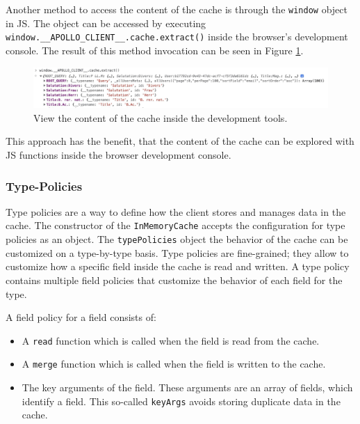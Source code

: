 \noindent Another method to access the content of the cache is through the \texttt{window} object in \ac{JS}. The object can be accessed by executing \texttt{window.\_\_APOLLO\_CLIENT\_\_.cache.extract()} inside the browser's development console. The result of this method invocation can be seen in Figure \ref{fig:background:graphql:apollo:apollo-cache-browser-window}.

\ifshowImages
  \begin{figure}[H]
    \centering
    \includegraphics[width=1\linewidth]{images/background/graphql/apollo/apollo-cache-browser-window.jpg}
    \caption{View the content of the cache inside the development tools.}\label{fig:background:graphql:apollo:apollo-cache-browser-window}
  \end{figure}
\fi

\noindent This approach has the benefit, that the content of the cache can be explored with \ac{JS} functions inside the browser development console.

\subsubsection{Type-Policies}\label{subsubsection:background:graphql:apollo-server-client:type-policies}

Type policies are a way to define how the client stores and manages data in the cache. The constructor of the \texttt{InMemoryCache} accepts the configuration for type policies as an object. The \texttt{typePolicies} object the behavior of the cache can be customized on a type-by-type basis. Type policies are fine-grained; they allow to customize how a specific field inside the cache is read and written. A type policy contains multiple field policies that customize the behavior of each field for the type. \cite{misc:-:background:graphql:apollo-client-cache-reading-writing}

\bigskip

\noindent A field policy for a field consists of: \cite{misc:-:background:graphql:apollo-client-cache-reading-writing}

\begin{itemize}
  \item A \texttt{read} function which is called when the field is read from the cache.
  \item A \texttt{merge} function which is called when the field is written to the cache.
  \item The key arguments of the field. These arguments are an array of fields, which identify a field. This so-called \texttt{keyArgs} avoids storing duplicate data in the cache.
\end{itemize}

